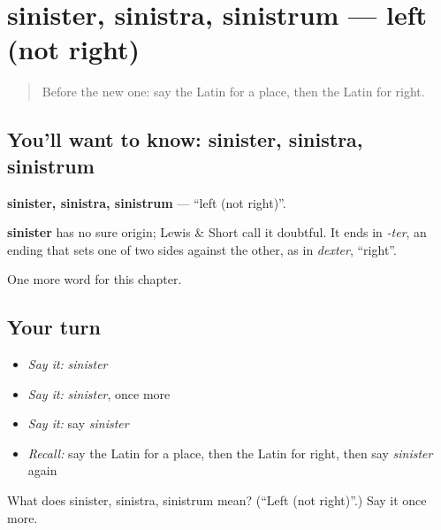 \section[sinister, sinistra, sinistrum]{sinister, sinistra, sinistrum — left (not right)}

\label{lesson:LA-C114-sinister}



\begin{quote}
Before the new one: say the Latin for a place, then the Latin for right.
\end{quote}

\subsection*{You'll want to know: sinister, sinistra, sinistrum}
\textbf{sinister, sinistra, sinistrum} — \textquotedblleft{}left (not right)\textquotedblright{}.

\begin{cousinweb}
\textbf{sinister} has no sure origin; Lewis \& Short call it doubtful. It ends in \emph{-ter}, an ending that sets one of two sides against the other, as in \emph{dexter}, \textquotedblleft{}right\textquotedblright{}.
\end{cousinweb}

\begin{grammarlens}[title={What you've built}]
One more word for this chapter.
\end{grammarlens}

\subsection*{Your turn}
\begin{itemize}
\raggedright
  \item \emph{Say it:} \emph{sinister}
  \item \emph{Say it:} \emph{sinister}, once more
  \item \emph{Say it:} say \emph{sinister}
  \item \emph{Recall:} say the Latin for a place, then the Latin for right, then say \emph{sinister} again
\end{itemize}

\begin{tcolorbox}[breakable,colback=teal!4,colframe=teal!35!black,title={Before you move on}]
What does sinister, sinistra, sinistrum mean? (\textquotedblleft{}Left (not right)\textquotedblright{}.) Say it once more.
\end{tcolorbox}
